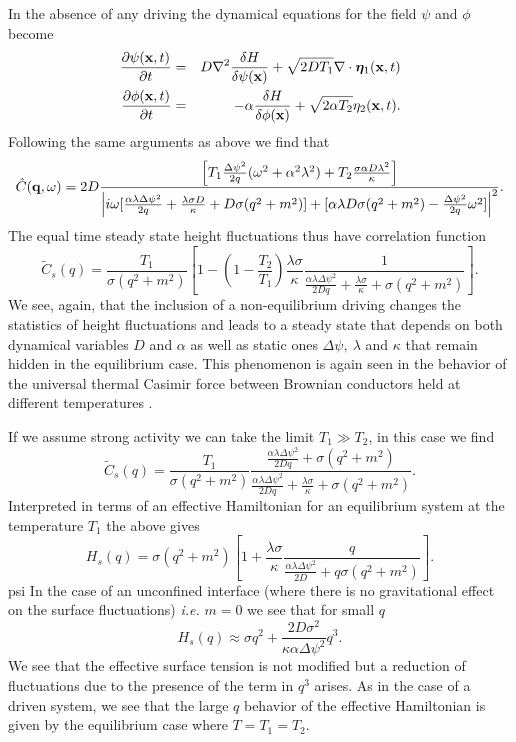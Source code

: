 In the absence of any driving the dynamical equations for the field $\psi$ and $\phi$ become 
\begin{eqnarray}
\frac{\partial \psi({\bf x},t)}{\partial t} &=& D\nabla^2\frac{\delta H}{\delta \psi({\bf x})}+ \sqrt{2D T_1}\nabla \cdot {\bm \eta}_1({\bf x},t) \\
\frac{\partial \phi({\bf x},t)}{\partial t} &=& -\alpha\frac{\delta H}{\delta \phi({\bf x})}+ \sqrt{2\alpha T_2}{ \eta}_2({\bf x},t).
\end{eqnarray}
Following the same arguments as above we find that
\begin{equation}
    \hat C({\bf q},\omega)  = 2D \frac{\left[ T_1\frac{\Delta\psi^2}{2q}(\omega^2+\alpha^2 \lambda^2) + T_2\frac{\sigma\alpha D\lambda^2}{\kappa}\right]}{\left|i\omega[\frac{\alpha\lambda\Delta\psi^2}{2 q} +  \frac{\lambda \sigma D}{\kappa} + D\sigma(q^2+m^2)]
+[\alpha\lambda D\sigma(q^2+m^2) -\frac{\Delta\psi^2}{2q}\omega^2]\right|^2}.
\end{equation}
The equal time steady state height fluctuations thus have correlation function
\begin{equation}
    \tilde C_s(q) = \frac{T_1}{\sigma (q^2 + m^2)}\left[ 1 -(1-\frac{T_2}{T_1})\frac{\lambda\sigma } {\kappa }\frac{1}{\frac{\alpha\lambda \Delta \psi^2}{2Dq}+ \frac{\lambda\sigma }{\kappa} + \sigma(q^2+m^2)}\right].
\end{equation}
We see, again, that the inclusion of a non-equilibrium driving changes the statistics of height fluctuations and leads to a steady state that depends on both dynamical variables
$D$ and $\alpha$ as well as static ones $\Delta\psi,\ \lambda$ and $\kappa$ that remain hidden in the equilibrium case. This phenomenon is again seen in the behavior of the universal thermal  Casimir force between Brownian conductors held at different temperatures \cite{lu2015}.

If we assume strong activity we can take the limit $T_1\gg T_2$, in this case we find
\begin{equation}
    \tilde C_s(q) = \frac{T_1}{\sigma (q^2 + m^2)}\frac{\frac{\alpha\lambda \Delta \psi^2}{2Dq}+
\sigma(q^2+m^2)}{\frac{\alpha\lambda \Delta \psi^2}{2Dq}+ \frac{\lambda\sigma }{\kappa} + \sigma(q^2+m^2)}.
\end{equation}
Interpreted in terms of an effective Hamiltonian for an equilibrium system at the temperature $T_1$ the above gives
\begin{equation}
    H_s(q) = \sigma (q^2 + m^2)\left[1+\frac{\lambda\sigma }{\kappa}\frac{q}{\frac{\alpha\lambda \Delta \psi^2}{2D}+
q\sigma(q^2+m^2)}\right].
\end{equation}psi
In the case of an unconfined interface (where there is no gravitational effect
on the surface fluctuations) {\em i.e.} $m=0$ we see that for small $q$
\begin{equation}
    H_s(q) \approx \sigma q^2 +\frac{2D\sigma^2 }{\kappa\alpha \Delta\psi^2}q^3 .
\end{equation}
We see that the effective surface tension is not modified but a reduction of fluctuations due to the presence of the term in $q^3$ arises.  As in the case of a driven system, we see that the large $q$ behavior of the effective Hamiltonian is given by the equilibrium case where $T=T_1=T_2$. 

